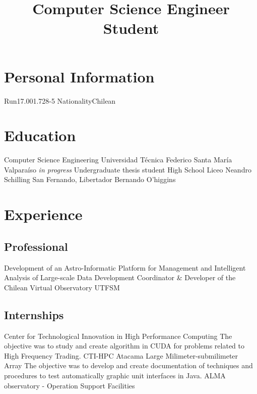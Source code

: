 \documentclass[11pt,a4paper]{moderncv}
\title{Computer Science Engineer Student}
\begin{document}
\maketitle

\section{Personal Information}
		{Run}{17.001.728-5}
						{Nationality}{Chilean}
							{}{}

\section{Education}
	{Computer Science Engineering}
	{Universidad Técnica Federico Santa María}
	{Valparaíso}
	{\emph{in progress}}
	{Undergraduate thesis student}
	{High School}
	{Liceo Neandro Schilling}
	{San Fernando, Libertador Bernando O'higgins}
	{}{}
\vspace{-0.5cm}

\section{Experience}
\subsection{Professional}
	{Development of an Astro-Informatic Platform for Management and Intelligent Analysis of Large-scale Data}
	{Development Coordinator \& Developer of the Chilean Virtual Observatory}
	{UTFSM}
	{}{}

\subsection{Internships}
	{Center for Technological Innovation in High Performance Computing}
	{The objective was to study and create algorithm in CUDA for problems related to High Frequency Trading.}
	{CTI-HPC}
	{}{}
	{Atacama Large Milimeter-submilimeter Array}
	{The objective was to develop and create documentation of techniques and
	procedures to test automatically graphic unit interfaces in Java.}
	{ALMA observatory - Operation Support Facilities}
	{}{}
\end{document}
